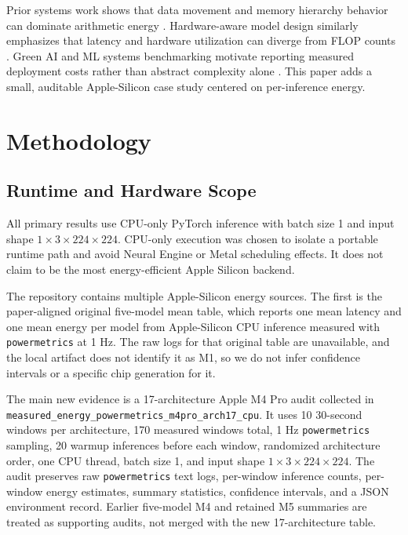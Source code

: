 \documentclass[conference]{IEEEtran}
\begin{document}
Prior systems work shows that data movement and memory hierarchy behavior can
dominate arithmetic energy \cite{horowitz2014, eyeriss2016}. Hardware-aware
model design similarly emphasizes that latency and hardware utilization can
diverge from FLOP counts \cite{mobilenetv3, efficientnet}. Green AI and ML
systems benchmarking motivate reporting measured deployment costs rather than
abstract complexity alone \cite{greenai, carbontracker}. This paper adds a
small, auditable Apple-Silicon case study centered on per-inference energy.

\section{Methodology}

\subsection{Runtime and Hardware Scope}

All primary results use CPU-only PyTorch inference with batch size 1 and input
shape $1\times3\times224\times224$. CPU-only execution was chosen to isolate a
portable runtime path and avoid Neural Engine or Metal scheduling effects. It
does not claim to be the most energy-efficient Apple Silicon backend.

The repository contains multiple Apple-Silicon energy sources. The first is the
paper-aligned original five-model mean table, which reports one mean latency
and one mean energy per model from Apple-Silicon CPU inference measured with
\texttt{powermetrics} at 1 Hz. The raw logs for that original table are
unavailable, and the local artifact does not identify it as M1, so we do not
infer confidence intervals or a specific chip generation for it.

The main new evidence is a 17-architecture Apple M4 Pro audit collected in
\texttt{measured\_energy\_powermetrics\_m4pro\_arch17\_cpu}. It uses 10
30-second windows per architecture, 170 measured windows total, 1 Hz
\texttt{powermetrics} sampling, 20 warmup inferences before each window,
randomized architecture order, one CPU thread, batch size 1, and input shape
$1\times3\times224\times224$. The audit preserves raw \texttt{powermetrics}
text logs, per-window inference counts, per-window energy estimates, summary
statistics, confidence intervals, and a JSON environment record. Earlier
five-model M4 and retained M5 summaries are treated as supporting audits, not
merged with the new 17-architecture table.
\end{document}
